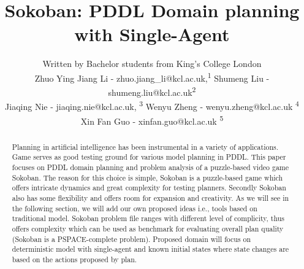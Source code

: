 \documentclass[letterpaper]{article} %
\title{Sokoban: PDDL Domain planning with Single-Agent}
\author{Written by Bachelor students from King's College London \\  %
Zhuo Ying Jiang Li - zhuo.jiang\_li@kcl.ac.uk,\textsuperscript{\rm 1} 
Shumeng Liu - shumeng.liu@kcl.ac.uk\textsuperscript{\rm 2} \\ 
Jiaqing Nie - jiaqing.nie@kcl.ac.uk, \textsuperscript{\rm 3} 
Wenyu Zheng - wenyu.zheng@kcl.ac.uk \textsuperscript{\rm 4} \\ 
Xin Fan Guo - xinfan.guo@kcl.ac.uk \textsuperscript{\rm 5} \\ %
}
\begin{document}
\maketitle

\begin{abstract}
Planning in artificial intelligence has been instrumental in a variety of applications. Game serves as good testing ground for various model planning in PDDL. This paper focuses on PDDL  domain planning and problem analysis of a puzzle-based video game Sokoban.  The reason for this choice is simple, Sokoban is a puzzle-based game which offers intricate dynamics and great complexity for testing planners. Secondly Sokoban also has some flexibility and offers room for expansion and creativity. As we will see in the following section, we will add our own proposed ideas i.e., tools based on traditional model.  Sokoban problem file ranges with different level of complicity, thus offers complexity which can be used as benchmark for evaluating overall plan quality (Sokoban is  a PSPACE-complete problem).  Proposed domain will focus on deterministic model with single-agent and known initial states where state changes are based on the actions proposed by plan. 
\end{abstract}
\end{document}

